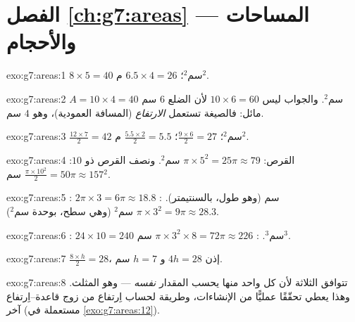 \section*{الفصل \ref{ch:g7:areas} --- المساحات والأحجام}

\begin{solution}{exo:g7:areas:1}
$8 \times 5 = 40$ سم$^2$؛ \qquad $6.5 \times 4 = 26$ م$^2$.
\end{solution}

\begin{solution}{exo:g7:areas:2}
$A = 10 \times 4 = 40$ سم$^2$. والجواب ليس
$10 \times 6 = 60$ لأن الضلع $6$ سم مائل: فالصيغة
تستعمل \emph{الارتفاع} (المسافة العمودية)، وهو $4$ سم.
\end{solution}

\begin{solution}{exo:g7:areas:3}
$\frac{12 \times 7}{2} = 42$ سم$^2$؛ \quad
$\frac{9 \times 6}{2} = 27$؛ \quad
$\frac{5.5 \times 2}{2} = 5.5$ م$^2$.
\end{solution}

\begin{solution}{exo:g7:areas:4}
القرص: $\pi \times 5^2 = 25\pi \approx 79$ سم$^2$. ونصف القرص ذو 
$10$: $\frac{\pi \times 10^2}{2} = 50\pi \approx 157$ سم$^2$.
\end{solution}

\begin{solution}{exo:g7:areas:5}
: $2\pi \times 3 = 6\pi \approx 18.8$ سم (وهو طول، بالسنتيمتر).
: $\pi \times 3^2 = 9\pi \approx 28.3$ سم$^2$ (وهي سطح، بوحدة
سم$^2$).
\end{solution}

\begin{solution}{exo:g7:areas:6}
: $24 \times 10 = 240$ سم$^3$. :
$\pi \times 3^2 \times 8 = 72\pi \approx 226$ سم$^3$.
\end{solution}

\begin{solution}{exo:g7:areas:7}
$\frac{8 \times h}{2} = 28$، إذن $4h = 28$ و $h = 7$ سم.
\end{solution}

\begin{solution}{exo:g7:areas:8}
تتوافق  الثلاثة لأن كل واحد منها يحسب المقدار
\emph{نفسه} --- وهو  المثلث. وهذا يعطي تحقّقًا عمليًّا
من الإنشاءات، وطريقة لحساب اِرتفاع من زوج
قاعدة--اِرتفاع آخر (مستعملة في \cref{exo:g7:areas:12}).
\end{solution}

